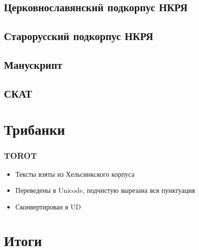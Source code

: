 \begin{frame}
  \frametitle{}
\end{frame}

\subsection{Церковнославянский подкорпус НКРЯ}



\subsection{Старорусский подкорпус НКРЯ}



\subsection{Манускрипт}



\subsection{СКАТ}



\section{Трибанки}
\frame{\tableofcontents[currentsection]}

\begin{frame}
  \frametitle{TOROT}

  \begin{itemize}
    \item Тексты взяты из Хельсинкского корпуса
    \item Переведены в Unicode, подчистую вырезана вся пунктуация
    \item Сконвертирован в UD
  \end{itemize}
\end{frame}

\section{Итоги}
\frame{\tableofcontents[currentsection]}

